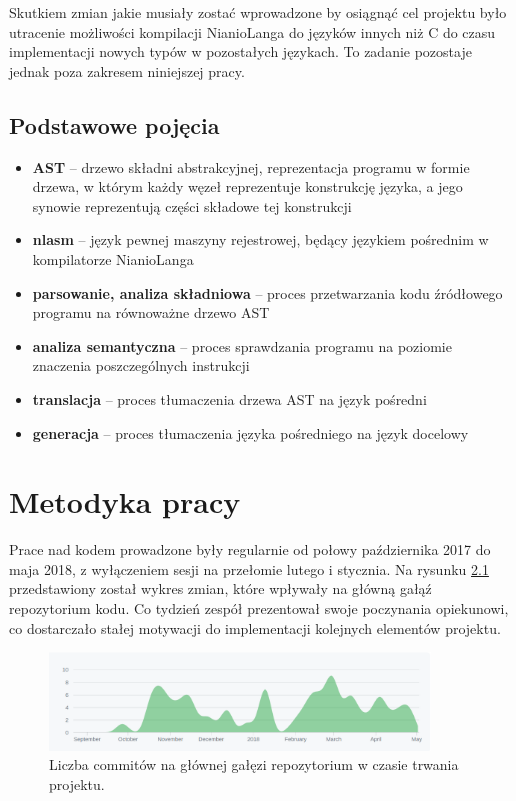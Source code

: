 \documentclass[licencjacka]{pracamgr}
\begin{document}
Skutkiem zmian jakie musiały zostać wprowadzone by osiągnąć cel projektu było utracenie możliwości
kompilacji NianioLanga do języków innych niż C do czasu implementacji nowych typów w pozostałych językach.
To zadanie pozostaje jednak poza zakresem niniejszej pracy.

\section{Podstawowe pojęcia}
\begin{itemize}
  \item[] \textbf{AST} -- drzewo składni abstrakcyjnej, reprezentacja programu w formie drzewa, w którym każdy węzeł
    reprezentuje konstrukcję języka, a jego synowie reprezentują części składowe tej konstrukcji
  \item[] \textbf{nlasm} -- język pewnej maszyny rejestrowej, będący językiem pośrednim w kompilatorze NianioLanga
  \item[] \textbf{parsowanie, analiza składniowa} -- proces przetwarzania kodu źródłowego programu na równoważne drzewo AST
  \item[] \textbf{analiza semantyczna} -- proces sprawdzania programu na poziomie znaczenia poszczególnych instrukcji
  \item[] \textbf{translacja} -- proces tłumaczenia drzewa AST na język pośredni
  \item[] \textbf{generacja} -- proces tłumaczenia języka pośredniego na język docelowy
\end{itemize}

\chapter{Metodyka pracy}
Prace nad kodem prowadzone były regularnie od połowy października 2017 do maja 2018,
z wyłączeniem sesji na przełomie lutego i stycznia. Na rysunku \ref{img:commits_over_time}
przedstawiony został wykres zmian, które wpływały na główną gałąź repozytorium kodu.
Co tydzień zespół prezentował swoje poczynania opiekunowi, co dostarczało stałej motywacji
do implementacji kolejnych elementów projektu.

\begin{figure}[h]
  \centering
  \includegraphics[width=0.9\textwidth]{files/commits_over_time}
  \caption{Liczba commitów na głównej gałęzi repozytorium w czasie trwania projektu.}
  \label{img:commits_over_time}
\end{figure}
\end{document}
